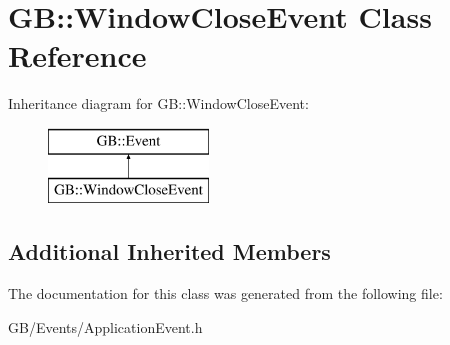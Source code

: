 \hypertarget{class_g_b_1_1_window_close_event}{}\section{GB\+::Window\+Close\+Event Class Reference}
\label{class_g_b_1_1_window_close_event}
Inheritance diagram for GB\+::Window\+Close\+Event\+:\begin{figure}[H]
\begin{center}
\leavevmode
\includegraphics[height=2.000000cm]{class_g_b_1_1_window_close_event}
\end{center}
\end{figure}
\subsection*{Additional Inherited Members}


The documentation for this class was generated from the following file\+:\begin{DoxyCompactItemize}
\item 
G\+B/\+Events/Application\+Event.\+h\end{DoxyCompactItemize}
